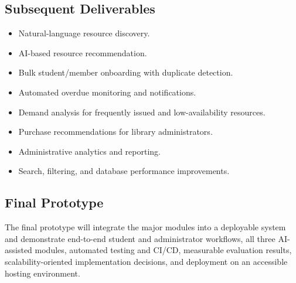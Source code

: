 \documentclass[11pt]{article}
\begin{document}
\subsection{Subsequent Deliverables}
\begin{itemize}
    \item Natural-language resource discovery.
    \item AI-based resource recommendation.
    \item Bulk student/member onboarding with duplicate detection.
    \item Automated overdue monitoring and notifications.
    \item Demand analysis for frequently issued and low-availability resources.
    \item Purchase recommendations for library administrators.
    \item Administrative analytics and reporting.
    \item Search, filtering, and database performance improvements.
\end{itemize}

\subsection{Final Prototype}
The final prototype will integrate the major modules into a deployable system and demonstrate end-to-end student and administrator workflows, all three AI-assisted modules, automated testing and CI/CD, measurable evaluation results, scalability-oriented implementation decisions, and deployment on an accessible hosting environment.
\end{document}
